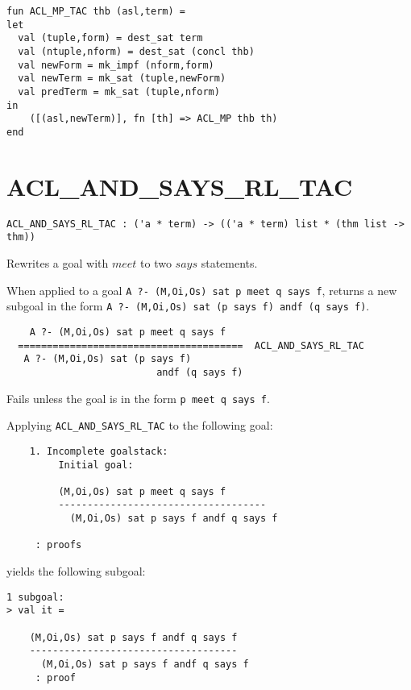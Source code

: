 \IMPLEMENTATION
\begin{holboxed}
\begin{verbatim}
fun ACL_MP_TAC thb (asl,term) =
let
  val (tuple,form) = dest_sat term
  val (ntuple,nform) = dest_sat (concl thb)
  val newForm = mk_impf (nform,form)
  val newTerm = mk_sat (tuple,newForm)
  val predTerm = mk_sat (tuple,nform)
in
    ([(asl,newTerm)], fn [th] => ACL_MP thb th)
end
\end{verbatim}
\end{holboxed}

\SEEALSO
\ENDDOC

\section{ACL\_AND\_SAYS\_RL\_TAC}



\small{
\begin{lstlisting}[breaklines]
ACL_AND_SAYS_RL_TAC : ('a * term) -> (('a * term) list * (thm list ->  thm))
\end{lstlisting}}\egroup


\SYNOPSIS
Rewrites a goal with $meet$ to two $says$ statements.

\DESCRIBE When applied to a goal \texttt{A ?- (M,Oi,Os) sat p meet q says f}, returns a new subgoal in the form \texttt{A ?- (M,Oi,Os) sat (p says f) andf (q says f)}.
\begin{verbatim}
    A ?- (M,Oi,Os) sat p meet q says f
  =======================================  ACL_AND_SAYS_RL_TAC
   A ?- (M,Oi,Os) sat (p says f) 
                          andf (q says f)
\end{verbatim}

\FAILURE 
Fails unless the goal is in the form \texttt{p meet q says f}.

\EXAMPLE
Applying \texttt{ACL\_AND\_SAYS\_RL\_TAC} to the following goal:
\begin{holboxed}
\begin{verbatim}
    1. Incomplete goalstack:
         Initial goal:
    
         (M,Oi,Os) sat p meet q says f
         ------------------------------------
           (M,Oi,Os) sat p says f andf q says f
    
     : proofs
\end{verbatim}
\end{holboxed}
yields the following subgoal:
\begin{holboxed}
\begin{verbatim}
1 subgoal:
> val it =
    
    (M,Oi,Os) sat p says f andf q says f
    ------------------------------------
      (M,Oi,Os) sat p says f andf q says f
     : proof
\end{verbatim}
\end{holboxed}

